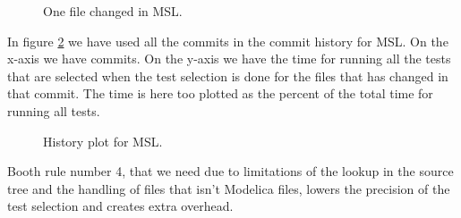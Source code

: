 \documentclass{cslthse-msc}
\begin{document}
\begin{figure}
    \centering
    \caption{One file changed in MSL.}
    \label{fig:mslonefile}
\end{figure}

In figure \ref{fig:mslhistory} we have used all the commits in the commit history for MSL. On the x-axis we have commits. On the y-axis we have the time for running all the tests that are selected when the test selection is done for the files that has changed in that commit. The time is here too plotted as the percent of the total time for running all tests.

\begin{figure}
    \centering
    \caption{History plot for MSL.}
    \label{fig:mslhistory}
\end{figure}
 
 Booth rule number 4, that we need due to limitations of the lookup in the source tree and the handling of files that isn't Modelica files, lowers the precision of the test selection and creates extra overhead.
\end{document}
